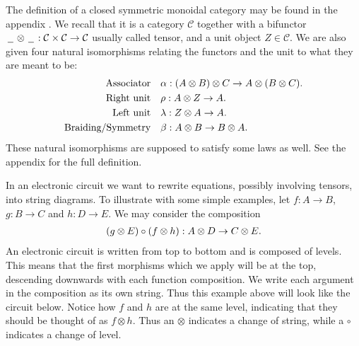\documentclass[../thesis.tex]{subfiles}
\begin{document}
            The definition of a closed symmetric monoidal category may be found in the appendix . We recall that it is a category $\mathcal{C}$ together with a bifunctor $\argument\otimes\argument : \mathcal{C}\times\mathcal{C}\rightarrow\mathcal{C}$ usually called tensor, and a unit object $Z\in \mathcal{C}$. We are also given four natural isomorphisms relating the functors and the unit to what they are meant to be:
            \begin{align*}
                \tt{Associator} & \quad \alpha : (A \otimes B) \otimes C \rightarrow A \otimes (B \otimes C)\tt{.}\\
                \tt{Right unit} & \quad \rho : A \otimes Z \rightarrow A\tt{.}\\
                \tt{Left unit} & \quad \lambda : Z \otimes A \rightarrow A\tt{.}\\
                \tt{Braiding/Symmetry} & \quad \beta : A \otimes B \rightarrow B \otimes A\tt{.}
            \end{align*}
            These natural isomorphisms are supposed to satisfy some laws as well. See the appendix for the full definition.

            In an electronic circuit we want to rewrite equations, possibly involving tensors, into string diagrams. To illustrate with some simple examples, let $f : A \rightarrow B$, $g : B \rightarrow C$ and $h : D \rightarrow E$. We may consider the composition
            \begin{align*}
                (g \otimes E) \circ (f \otimes h) : A \otimes D \rightarrow C \otimes E \tt{.}
            \end{align*}
            An electronic circuit is written from top to bottom and is composed of levels. This means that the first morphisms which we apply will be at the top, descending downwards with each function composition. We write each argument in the composition as its own string. Thus this example above will look like the circuit below. Notice how $f$ and $h$ are at the same level, indicating that they should be thought of as $f \otimes h$. Thus an $\otimes$ indicates a change of string, while a $\circ$ indicates a change of level.
            
\end{document}
